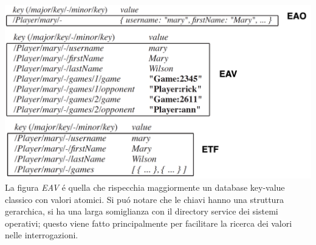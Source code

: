 \includegraphics[width=1\textwidth]{img/implementazione}\\

La figura \emph{EAV} é quella che rispecchia maggiormente un database key-value classico con valori atomici.
Si puó notare che le chiavi hanno una struttura gerarchica, si ha una larga somiglianza con il directory service dei sistemi operativi;
questo viene fatto principalmente per facilitare la ricerca dei valori nelle interrogazioni.
